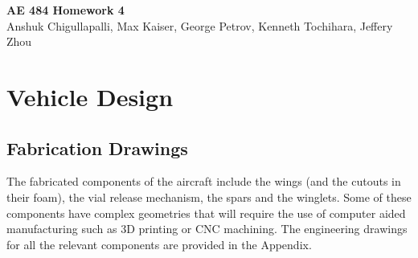 




\begin{center}
    {\Large\textbf{AE 484 Homework 4}}\\
    Anshuk Chigullapalli, Max Kaiser, George Petrov, Kenneth Tochihara, Jeffery Zhou\\
\end{center}

\section{Vehicle Design}

    \subsection{Fabrication Drawings}
    
        The fabricated components of the aircraft include the  wings (and the cutouts in their foam), the vial release mechanism, the spars and the winglets. Some of these components have complex geometries that will require the use of computer aided manufacturing such as 3D printing or CNC machining. The engineering drawings for all the relevant components are provided in the Appendix.
    

